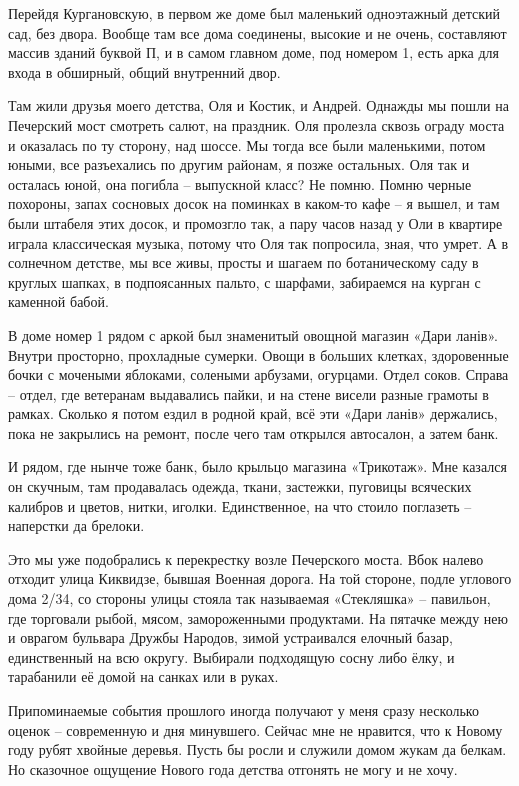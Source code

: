 Перейдя Кургановскую, в первом же доме был маленький одноэтажный детский сад, без двора. Вообще там все дома соединены, высокие и не очень, составляют массив зданий буквой П, и в самом главном доме, под номером 1, есть арка для входа в обширный, общий внутренний двор.

Там жили друзья моего детства, Оля и Костик, и Андрей. Однажды мы пошли на Печерский мост смотреть салют, на праздник. Оля пролезла сквозь ограду моста и оказалась по ту сторону, над шоссе. Мы тогда все были маленькими, потом юными, все разъехались по другим районам, я позже остальных. Оля так и осталась юной, она погибла – выпускной класс? Не помню. Помню черные похороны, запах сосновых досок на поминках в каком-то кафе – я вышел, и там были штабеля этих досок, и промозгло так, а пару часов назад у Оли в квартире играла классическая музыка, потому что Оля так попросила, зная, что умрет. А в солнечном детстве, мы все живы, просты и шагаем по ботаническому саду в круглых шапках, в подпоясанных пальто, с шарфами, забираемся на курган с каменной бабой.

В доме номер 1 рядом с аркой был знаменитый овощной магазин «Дари ланів». Внутри просторно, прохладные сумерки. Овощи в больших клетках, здоровенные бочки с мочеными яблоками, солеными арбузами, огурцами. Отдел соков. Справа – отдел, где ветеранам выдавались пайки, и на стене висели разные грамоты в рамках. Сколько я потом ездил в родной край, всё эти «Дари ланів» держались, пока не закрылись на ремонт, после чего там открылся автосалон, а затем банк.

И рядом, где нынче тоже банк, было крыльцо магазина «Трикотаж». Мне казался он скучным, там продавалась одежда, ткани, застежки, пуговицы всяческих калибров и цветов, нитки, иголки. Единственное, на что стоило поглазеть – наперстки да брелоки.

Это мы уже подобрались к перекрестку возле Печерского моста. Вбок налево отходит улица Киквидзе, бывшая Военная дорога. На той стороне, подле углового дома 2/34, со стороны улицы стояла так называемая «Стекляшка» – павильон, где торговали рыбой, мясом, замороженными продуктами. На пятачке между нею и оврагом  бульвара Дружбы Народов, зимой устраивался елочный базар, единственный на всю округу. Выбирали подходящую сосну либо ёлку, и тарабанили её домой на санках или в руках.

Припоминаемые события прошлого иногда получают у меня сразу несколько оценок – современную и дня минувшего. Сейчас мне не нравится, что к Новому году рубят хвойные деревья. Пусть бы росли и служили домом жукам да белкам. Но сказочное ощущение Нового года детства отгонять не могу и не хочу.

